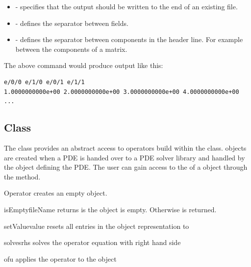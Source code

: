 \begin{itemize}
 \item {} - specifies that the output should be written to the end of an existing file.
\item {} - defines the separator between fields.
\item {} - defines the separator between components in the header line. For example between the components of a matrix. 
\end{itemize}

The above command would produce output like this:
\begin{verbatim}
e/0/0 e/1/0 e/0/1 e/1/1
1.0000000000e+00 2.0000000000e+00 3.0000000000e+00 4.0000000000e+00
... 
\end{verbatim}



\subsection{\Operator Class}
The \Operator class provides an abstract access to operators build
within the \LinearPDE class. \Operator objects are created 
when a PDE is handed over to a PDE solver library and handled
by the \LinearPDE object defining the PDE. The user can gain access
to the \Operator of a \LinearPDE object through the 
method.

\begin{classdesc}{Operator}{}
creates an empty \Operator object.
\end{classdesc}

\begin{methoddesc}[Operator]{isEmpty}{fileName}
returns \True is the object is empty. Otherwise \True is returned.
\end{methoddesc}

\begin{methoddesc}[Operator]{setValue}{value}
resets all entries in the object representation to 
\end{methoddesc}

\begin{methoddesc}[Operator]{solves}{rhs}
solves the operator equation with right hand side 
\end{methoddesc}

\begin{methoddesc}[Operator]{of}{u}
applies the operator to the \Data object 
\end{methoddesc}

